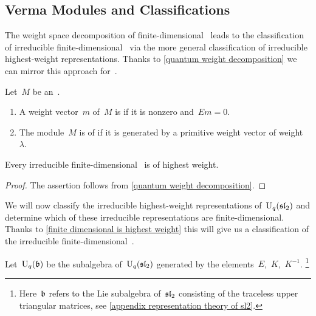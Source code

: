 \documentclass[a4paper, 11pt, oneside]{scrartcl}
\begin{document}
\subsection{Verma Modules and Classifications}

The weight space decomposition of finite-dimensional~ leads to the classification of irreducible finite-dimensional~ via the more general classification of irreducible highest-weight representations.
Thanks to \cref{quantum weight decomposition} we can mirror this approach for~.

\begin{definition}
  Let~$M$ be an~.
  \begin{enumerate}
    \item
      A weight vector~$m$ of~$M$ is  if it is nonzero and~$Em = 0$.
    \item
      The module~$M$ is of  if it is generated by a primitive weight vector of weight~$\lambda$.
  \end{enumerate}
\end{definition}

\begin{proposition}
  \label{finite dimensional is highest weight}
  Every irreducible finite-dimensional~ is of highest weight.
\end{proposition}

\begin{proof}
  The assertion follows from \cref{quantum weight decomposition}.
\end{proof}

We will now classify the irreducible highest-weight representations of~$\operatorname{U}_q(\mathfrak{sl}_2)$ and determine which of these irreducible representations are finite-dimensional.
Thanks to \cref{finite dimensional is highest weight} this will give us a classification of the irreducible finite-dimensional~.

\begin{definition}
  Let~$\operatorname{U}_q(\mathfrak{b})$ be the subalgebra of~$\operatorname{U}_q(\mathfrak{sl}_2)$ generated by the elements~$E$,~$K$,~$K^{-1}$.%
  \footnote{
    Here~$\mathfrak{b}$ refers to the Lie subalgebra of~$\mathfrak{sl}_2$ consisting of the traceless upper triangular matrices, see \cref{appendix representation theory of sl2}.
  }
\end{definition}
\end{document}
